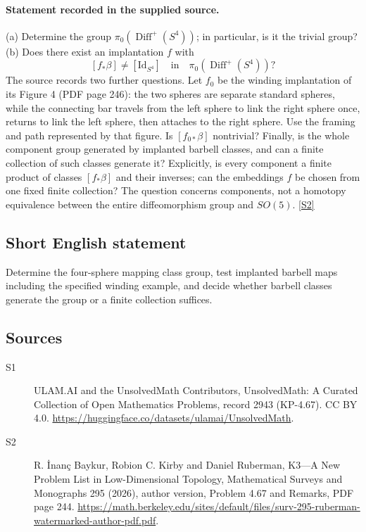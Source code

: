 \documentclass[11pt]{article}
\newcommand{\sref}[2]{\hyperlink{source:#1:#2}{[S#2]}}
\begin{document}
\paragraph{Statement recorded in the supplied source.}
(a) Determine the group $\pi_0(\operatorname{Diff}^+(S^4))$; in particular, is it the trivial group? (b) Does there exist an implantation $f$ with
\[
[f_*\beta]\ne[\mathrm{Id}_{S^4}]\quad\text{in}\quad\pi_0(\operatorname{Diff}^+(S^4))?
\]
The source records two further questions. Let $f_0$ be the winding implantation of its Figure 4 (PDF page 246): the two spheres are separate standard spheres, while the connecting bar travels from the left sphere to link the right sphere once, returns to link the left sphere, then attaches to the right sphere. Use the framing and path represented by that figure. Is $[f_{0*}\beta]$ nontrivial? Finally, is the whole component group generated by implanted barbell classes, and can a finite collection of such classes generate it? Explicitly, is every component a finite product of classes $[f_*\beta]$ and their inverses; can the embeddings $f$ be chosen from one fixed finite collection? The question concerns components, not a homotopy equivalence between the entire diffeomorphism group and $SO(5)$. \sref{2943}{2}
\subsection{Short English statement}
Determine the four-sphere mapping class group, test implanted barbell maps including the specified winding example, and decide whether barbell classes generate the group or a finite collection suffices.
\subsection{Sources}
\begin{description}
\item[\hypertarget{source:2943:1}{S1}] ULAM.AI and the UnsolvedMath Contributors, UnsolvedMath: A Curated Collection of Open Mathematics Problems, record 2943 (KP-4.67). CC BY 4.0. \url{https://huggingface.co/datasets/ulamai/UnsolvedMath}.
\item[\hypertarget{source:2943:2}{S2}] R. İnanç Baykur, Robion C. Kirby and Daniel Ruberman, K3—A New Problem List in Low-Dimensional Topology, Mathematical Surveys and Monographs 295 (2026), author version, Problem 4.67 and Remarks, PDF page 244. \url{https://math.berkeley.edu/sites/default/files/surv-295-ruberman-watermarked-author-pdf.pdf}.
\end{description}
\label{end:2943}
\end{document}
